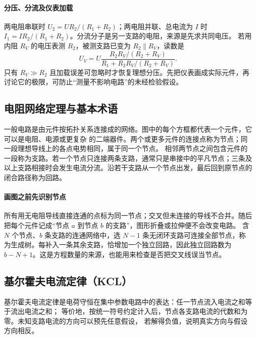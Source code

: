 {%
\paragraph{分压、分流及仪表加载}
两电阻串联时 $U_2=UR_2/(R_1+R_2)$；两电阻并联、总电流为 $I$ 时 $I_1=IR_2/(R_1+R_2)$。分流分子是另一支路的电阻，来源是先求共同电压。
若用内阻 $R_V$ 的电压表测 $R_2$，被测支路已变为 $R_2\parallel R_V$，读数是
\[
 U_V=U\frac{R_2R_V/(R_2+R_V)}{R_1+R_2R_V/(R_2+R_V)}.
\]
只有 $R_V\gg R_2$ 且加载误差可忽略时才恢复理想分压。先把仪表画成实际元件，再讨论它的极限，可防止“测量不影响电路”的未经检验假设。


\subsection{电阻网络定理与基本术语}


一般电路是由元件按拓扑关系连接成的网络。图中的每个方框都代表一个元件，它可以是电阻、电源或更复杂
的二端器件。两个或更多元件的连接点称为节点；同一段理想导线上的各点电势相同，属于同一个节点。
相邻两节点之间包含元件的一段称为支路。若一个节点只连接两条支路，通常只是串接中的平凡节点；三条及
以上支路相接时会发生电流分流。沿若干支路从一个节点出发，最后回到原节点的闭合路径称为回路。

\par\noindent\begin{minipage}{\linewidth}
\networkTermsFigure
{}
\end{minipage}\par\medskip


\paragraph{画图之前先识别节点}
所有用无电阻导线直接连通的点标为同一节点；交叉但未连接的导线不合并。随后把每个元件记成“节点 $a$ 到节点 $b$ 的支路”，图形折叠或拉伸便不会改变电路。
含 $N$ 个节点、$b$ 条支路的连通网络中，选 $N-1$ 条无闭环支路可连接全部节点，称为生成树。每补入一条其余支路，恰增加一个独立回路，因此独立回路数为 $b-N+1$。这是方程数量的来源，也能用来检查是否把交叉线误当节点。


\subsection{基尔霍夫电流定律（KCL）}


基尔霍夫电流定律是电荷守恒在集中参数电路中的表达：任一节点流入电流之和等于流出电流之和；
等价地，按统一符号约定计入后，节点各支路电流的代数和为零。未知支路电流的方向可以预先任意假设，
若解得负值，说明真实方向与假设方向相反。

}
